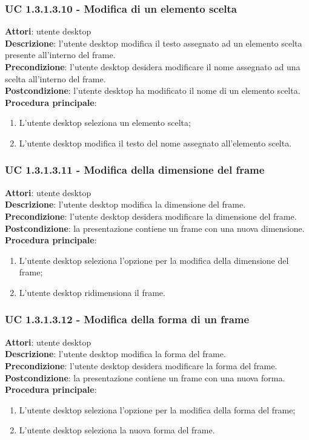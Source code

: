 \subsubsection{UC 1.3.1.3.10 - Modifica di un elemento scelta}{
	\label{uc1.3.1.3.10}
	\textbf{Attori}: utente desktop \\
	\textbf{Descrizione}: l'utente desktop modifica il testo assegnato ad un elemento scelta presente all'interno del frame. \\
	\textbf{Precondizione}: l'utente desktop desidera modificare il nome assegnato ad una scelta all'interno del frame.	\\
	\textbf{Postcondizione}: l'utente desktop ha modificato il nome di un elemento scelta.	\\
	\textbf{Procedura principale}:
	\begin{enumerate}
		\item L'utente desktop seleziona un elemento scelta;
		\item L'utente desktop modifica il testo del nome assegnato all'elemento scelta.
	\end{enumerate}
	}
\subsubsection{UC 1.3.1.3.11 - Modifica della dimensione del frame}{
	\label{uc1.3.1.3.11}
	\textbf{Attori}: utente desktop \\
	\textbf{Descrizione}: l'utente desktop modifica la dimensione del frame. \\
	\textbf{Precondizione}: l'utente desktop desidera modificare la dimensione del frame.	\\
	\textbf{Postcondizione}: la presentazione contiene un frame con una nuova dimensione.	\\
	\textbf{Procedura principale}:
	\begin{enumerate}
		\item L'utente desktop seleziona l'opzione per la modifica della dimensione del frame;
		\item L'utente desktop ridimensiona il frame.
	\end{enumerate}
	}
\subsubsection{UC 1.3.1.3.12 - Modifica della forma di un frame}{
	\label{uc1.3.1.3.12}
	\textbf{Attori}: utente desktop \\
	\textbf{Descrizione}: l'utente desktop modifica la forma del frame. \\
	\textbf{Precondizione}: l'utente desktop desidera modificare la forma del frame.	\\
	\textbf{Postcondizione}: la presentazione contiene un frame con una nuova forma.	\\
	\textbf{Procedura principale}:
	\begin{enumerate}
		\item L'utente desktop seleziona l'opzione per la modifica della forma del frame;
		\item L'utente desktop seleziona la nuova forma del frame.
	\end{enumerate}
	}
